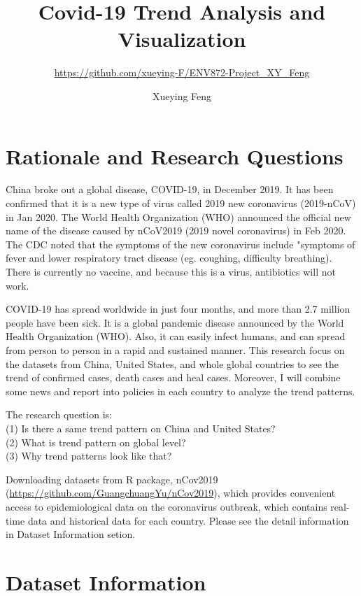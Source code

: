 \documentclass[12pt,]{article}
\title{Covid-19 Trend Analysis and Visualization}
\subtitle{\url{https://github.com/xueying-F/ENV872-Project_XY_Feng}}
\author{Xueying Feng}
\date{}
\begin{document}
\maketitle

\newpage
\tableofcontents 
\newpage
\listoftables 
\newpage
\listoffigures 
\newpage

\hypertarget{rationale-and-research-questions}{%
\section{Rationale and Research
Questions}\label{rationale-and-research-questions}}

China broke out a global disease, COVID-19, in December 2019. It has
been confirmed that it is a new type of virus called 2019 new
coronavirus (2019-nCoV) in Jan 2020. The World Health Organization (WHO)
announced the official new name of the disease caused by nCoV2019 (2019
novel coronavirus) in Feb 2020. The CDC noted that the symptoms of the
new coronavirus include "symptoms of fever and lower respiratory tract
disease (eg. coughing, difficulty breathing). There is currently no
vaccine, and because this is a virus, antibiotics will not work.

COVID-19 has spread worldwide in just four months, and more than 2.7
million people have been sick. It is a global pandemic disease announced
by the World Health Organization (WHO). Also, it can easily infect
humans, and can spread from person to person in a rapid and sustained
manner. This research focus on the datasets from China, United States,
and whole global countries to see the trend of confirmed cases, death
cases and heal cases. Moreover, I will combine some news and report into
policies in each country to analyze the trend patterns.

The research question is:\\
(1) Is there a same trend pattern on China and United States?\\
(2) What is trend pattern on global level?\\
(3) Why trend patterns look like that?

Downloading datasets from R package, nCov2019
(\url{https://github.com/GuangchuangYu/nCov2019}), which provides
convenient access to epidemiological data on the coronavirus outbreak,
which contains real-time data and historical data for each country.
Please see the detail information in Dataset Information setion.

\newpage

\hypertarget{dataset-information}{%
\section{Dataset Information}\label{dataset-information}}
\end{document}
